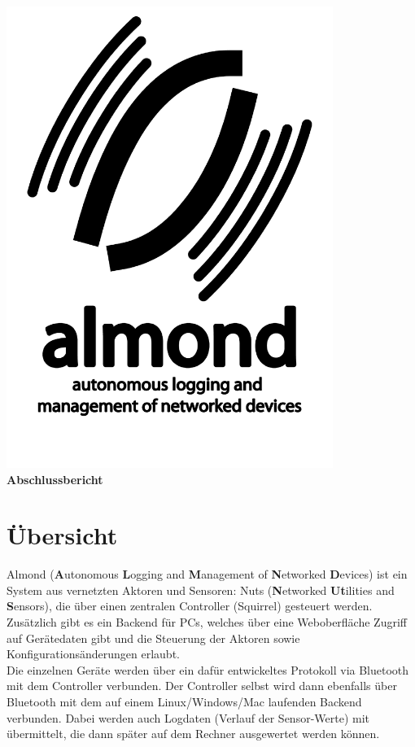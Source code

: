 \documentclass[12pt,a4paper]{article}
\begin{document}
\begin{titlepage}
	\begin{center}
		\includegraphics[height=15cm]{./logo.pdf}\\
		{\LARGE \bf Abschlussbericht}\\[0.3cm]
	\end{center}
\end{titlepage}

\tableofcontents

\newpage


\section{Übersicht}
Almond ({\bf A}utonomous {\bf L}ogging and {\bf M}anagement of {\bf N}etworked {\bf D}evices) ist ein System aus vernetzten Aktoren und Sensoren: Nuts ({\bf N}etworked {\bf Ut}ilities and {\bf S}ensors), die über einen zentralen Controller (Squirrel) gesteuert werden. Zusätzlich gibt es ein Backend für PCs, welches über eine Weboberfläche Zugriff auf Gerätedaten gibt und die Steuerung der Aktoren sowie Konfigurationsänderungen erlaubt.\\
Die einzelnen Geräte werden über ein dafür entwickeltes Protokoll via Bluetooth mit dem Controller verbunden. Der Controller selbst wird dann ebenfalls über Bluetooth mit dem auf einem Linux/Windows/Mac laufenden Backend verbunden. Dabei werden auch Logdaten (Verlauf der Sensor-Werte) mit übermittelt, die dann später auf dem Rechner ausgewertet werden können.
\end{document}
